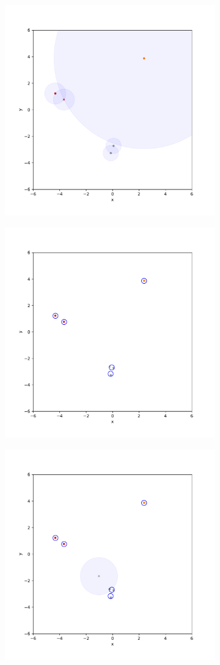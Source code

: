 \documentclass{beamer}
\begin{document}
\begin{frame}
    \centering
    \includegraphics[width=9.1cm]{step1.pdf}
\end{frame}

\begin{frame}
    \centering
    \includegraphics[width=9.1cm]{step2.pdf}
\end{frame}

\begin{frame}
    \centering
    \includegraphics[width=9.1cm]{step3.pdf}
\end{frame}
\end{document}
